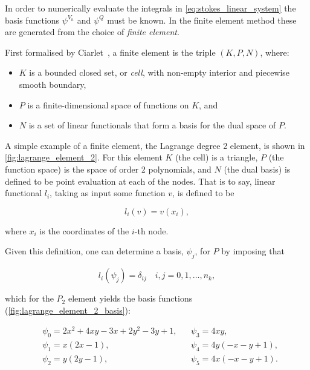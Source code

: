 \documentclass[thesis]{subfiles}
\begin{document}
In order to numerically evaluate the integrals in \cref{eq:stokes_linear_system} the basis functions $\psi^{V_h}$ and $\psi^Q$ must be known.
In the finite element method these are generated from the choice of \textit{finite element}.

First formalised by Ciarlet~\parencite{ciarletElement2002}, a finite element is the triple $(K, P, N)$, where:

\begin{itemize}
  \item $K$ is a bounded closed set, or \textit{cell}, with non-empty interior and piecewise smooth boundary,
  \item $P$ is a finite-dimensional space of functions on $K$, and
  \item $N$ is a set of linear functionals that form a basis for the dual space of $P$.
\end{itemize}

A simple example of a finite element, the Lagrange degree 2 element, is shown in \cref{fig:lagrange_element_2}.
For this element $K$ (the cell) is a triangle, $P$ (the function space) is the space of order 2 polynomials, and $N$ (the dual basis) is defined to be point evaluation at each of the nodes.
That is to say, linear functional $l_i$, taking as input some function $v$, is defined to be

\begin{equation*}
  l_i(v) = v(x_i),
\end{equation*}

\noindent
where $x_i$ is the coordinates of the $i$-th node.

Given this definition, one can determine a basis, $\psi_j$, for $P$ by imposing that


\begin{equation*}
  l_i(\psi_j) = \delta_{ij} \quad i, j = 0, 1, \dots, n_k,
\end{equation*}

\noindent
which for the $P_2$ element yields the basis functions (\cref{fig:lagrange_element_2_basis}):

\begin{align}
  &\psi_0 = 2x^2 + 4xy - 3x + 2y^2-3y+1,
  &
  &\psi_3 = 4xy, \\
  &\psi_1 = x(2x-1),
  &
  &\psi_4 = 4y(-x-y+1), \\
  &\psi_2 = y(2y-1),
  &
  &\psi_5 = 4x(-x-y+1).
  \label{eq:basis_functions}
\end{align}
\end{document}
